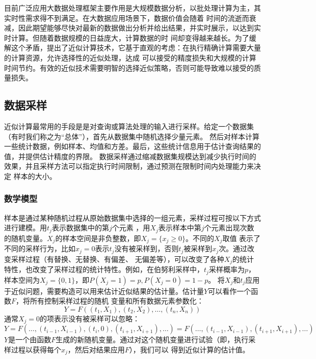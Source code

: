 \documentclass[master]{thesis-uestc}
\begin{document}
    目前广泛应用大数据处理框架主要作用是大规模数据分析，以批处理计算为主，其实时性需求得不到满足。在大数据应用场景下，数据价值会随着
时间的流逝而衰减，因此期望能够尽快对最新的数据做出分析并给出结果，并实时展示，以达到实时计算。但随着数据规模的日益庞大，计算数据的时
间却变得越来越长。为了缓解这个矛盾，提出了近似计算技术，它基于直观的考虑：在执行精确计算需要大量的计算资源，允许选择性的近似处理，达成
可以接受的精度损失和大规模的计算时间节约。有效的近似技术需要明智的选择近似策略，否则可能导致难以接受的质量损失。

\subsection{数据采样}
\label{subsec:sample}
    近似计算最常用的手段是是对查询或算法处理的输入进行采样。给定一个数据集（有时我们称之为“总体”），首先从数据集中随机选择少量元素。
然后对样本计算一些统计数据，例如样本、均值和方差。最后，这些统计信息用于估计查询结果的值，并提供估计精度的界限。
数据采样通过缩减数据集规模达到减少执行时间的效果，并且采样方法可以指定执行时间限制，通过预测在限制时间内处理能力来决定
样本的大小。
    
\subsubsection{数学模型}
\label{subsubsec:math-model}
    样本是通过某种随机过程从原始数据集中选择的一组元素，采样过程可按以下方式进行建模。用$t_j$表示数据集中的第$j$个元素
，用$X_j$表示样本中第$j$个元素出现次数的随机变量。$X_j$的样本空间是非负整数，即$X_j = \{x_j \ge 0\}$。不同的$X_j$取值
表示了不同的采样行为，比如$x_j = 0$表示$t_j$没有被采样到，否则$t_j$被采样到$x_j$次。通过改变采样过程（有替换、无替换、有偏差、
无偏差等），可以改变了各种$X_j$的统计特性，也改变了采样过程的统计特性。例如，在伯努利采样中，$t_j$采样概率为$p$，
样本空间为$X_j = \{0, 1\}$，即$P(X_j = 1) = p, P(X_j = 0) = 1-p$。
    将$X_j$和$t_j$应用于近似问题，需要构造可以用来估计近似结果的估计量。估计量$Y$可以看作一个函数$F$，将所有控制采样过程的随机
变量和所有数据元素参数化：
\begin{equation*}
    Y=F((t_1,X_1), (t_2,X_2),\ldots,(t_n,X_n))
\end{equation*}
通常$X_j = 0$的项表示没有被采样可以忽略：
\begin{equation*}
    Y=F(\ldots,(t_{i-1},X_{i-1}), (t_i,0),(t_{i+1},X_{i+1}),\ldots)=F(\ldots,(t_{i-1},X_{i-1}),(t_{i+1},X_{i+1}),\ldots)
\end{equation*}
    $Y$是一个由函数$F$生成的新随机变量。通过对这个随机变量进行试验（即，执行采样过程以获得每个$x_j$，然后对结果应用$F$），我们可以
得到近似计算的估计值。
\end{document}
